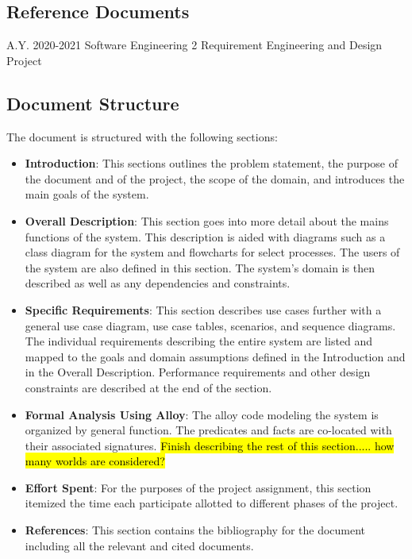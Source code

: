 \subsection{Reference Documents}
A.Y. 2020-2021 Software Engineering 2 Requirement Engineering and Design Project \smallskip\\




\subsection{Document Structure}
The document is structured with the following sections:
\begin{itemize}
\item \textbf{Introduction}: This sections outlines the problem statement, the purpose of the document and of the project, the scope of the domain, and introduces the main goals of the system. 
\item \textbf{Overall Description}: This section goes into more detail about the mains functions of the system. This description is aided with diagrams such as a class diagram for the system and flowcharts for select processes. The users of the system are also defined in this section. The system's domain is then described as well as any dependencies and constraints. 
\item \textbf{Specific Requirements}: This section describes use cases further with a general use case diagram, use case tables, scenarios, and sequence diagrams. The individual requirements describing the entire system are listed and mapped to the goals and domain assumptions defined in the Introduction and in the Overall Description. Performance requirements and other design constraints are described at the end of the section.
\item \textbf{Formal Analysis Using Alloy}: The alloy code modeling the system is organized by general function. The predicates and facts are co-located with their associated signatures. \hl{Finish describing the rest of this section..... how many worlds are considered?} 
\item \textbf{Effort Spent}: For the purposes of the project assignment, this section itemized the time each participate allotted to different phases of the project. 
\item \textbf{References}: This section contains the bibliography for the document including all the relevant and cited documents.  
\end{itemize}


